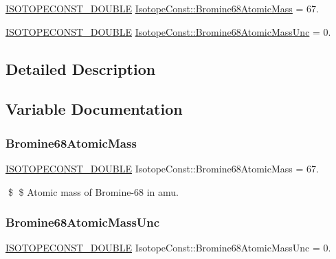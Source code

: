 \begin{DoxyCompactItemize}
\item 
\mbox{\hyperlink{group___isotope_const-_macros_ga8f45a7272ce02c0b4c65c44636ed719a}{I\+S\+O\+T\+O\+P\+E\+C\+O\+N\+S\+T\+\_\+\+D\+O\+U\+B\+LE}} \mbox{\hyperlink{group___isotope_const-_bromine-_br68_ga9b92aa1196cad26fa47a8b58f518a70b}{Isotope\+Const\+::\+Bromine68\+Atomic\+Mass}} = 67.
\item 
\mbox{\hyperlink{group___isotope_const-_macros_ga8f45a7272ce02c0b4c65c44636ed719a}{I\+S\+O\+T\+O\+P\+E\+C\+O\+N\+S\+T\+\_\+\+D\+O\+U\+B\+LE}} \mbox{\hyperlink{group___isotope_const-_bromine-_br68_ga6713629434ab245de19e201d6e01151f}{Isotope\+Const\+::\+Bromine68\+Atomic\+Mass\+Unc}} = 0.
\end{DoxyCompactItemize}


\subsection{Detailed Description}


\subsection{Variable Documentation}
\mbox{\label{group___isotope_const-_bromine-_br68_ga9b92aa1196cad26fa47a8b58f518a70b}} 
\subsubsection{\texorpdfstring{Bromine68\+Atomic\+Mass}{Bromine68AtomicMass}}
{\footnotesize\ttfamily \mbox{\hyperlink{group___isotope_const-_macros_ga8f45a7272ce02c0b4c65c44636ed719a}{I\+S\+O\+T\+O\+P\+E\+C\+O\+N\+S\+T\+\_\+\+D\+O\+U\+B\+LE}} Isotope\+Const\+::\+Bromine68\+Atomic\+Mass = 67.}

\$ \$ Atomic mass of Bromine-\/68 in amu. \mbox{\label{group___isotope_const-_bromine-_br68_ga6713629434ab245de19e201d6e01151f}} 
\subsubsection{\texorpdfstring{Bromine68\+Atomic\+Mass\+Unc}{Bromine68AtomicMassUnc}}
{\footnotesize\ttfamily \mbox{\hyperlink{group___isotope_const-_macros_ga8f45a7272ce02c0b4c65c44636ed719a}{I\+S\+O\+T\+O\+P\+E\+C\+O\+N\+S\+T\+\_\+\+D\+O\+U\+B\+LE}} Isotope\+Const\+::\+Bromine68\+Atomic\+Mass\+Unc = 0.}

